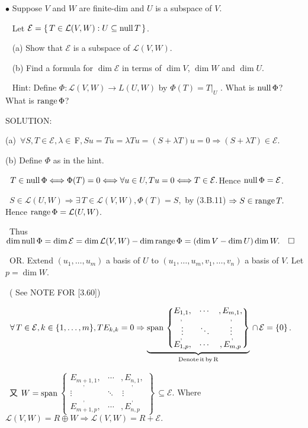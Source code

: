 \documentclass[a4paper, 11pt, UTF8]{article}
\def\range{\textup{range}\,}
\def\null{\textup{null\,}}
\def\Spn{\textup{span}\,}
\def\Lm{\mathcal{L}}
\def\Fbfc{$\,{\timesbf F}$}
\begin{document}
\begin{large}
{\small $\bullet$} {\timessl\Large 
Suppose $V$ and $W$ are finite-dim and $U$ is a subspace of $V$.}\par\,\,\,
{\timessl\Large Let $\mathcal{E} = \{\,T\in\Lm(V, W): U\subseteq\null T\,\}$.}\par\,\,\,
(a) {\timessl\Large Show that $\mathcal{E}$ is a subspace of $\Lm(V, W)$.}\par\,\,\,
(b) {\timessl\Large Find a formula for $\dim \mathcal{E}$ in terms of $\dim V$, $\dim W$ and $\dim U$.}\par\,\,\,
{\timessl\normalsize
Hint: Define $\Phi:\Lm(V, W)\rightarrow L(U, W)$ by $\Phi(T) = T|_U$ . What is $\null\Phi$?
What is $\range\Phi$?
}\par
{\timesbf S\footnotesize{OLUTION:}}\par\quad
(a) \,$\forall S,T\in\mathcal{E},\lambda\in\Fbfc,Su=Tu=\lambda Tu=(S+\lambda T)u=0\Rightarrow(S+\lambda T)\in\mathcal{E}.$\par\quad
(b) Define $\Phi$ as in the hint.\par\qquad\,
$T\in\null\Phi\Longleftrightarrow\Phi(T)=0\Longleftrightarrow\forall u\in U,Tu=0\Longleftrightarrow T\in\mathcal{E}.$\qquad\qquad\qquad Hence $\null\Phi=\mathcal{E}$.\par\qquad\,
$S\in\Lm(U,W)\Rightarrow\exists\,T\in\Lm(V,W),\Phi(T)=S,$ by (3.B.11) $\Rightarrow S\in\range T.\,$\quad Hence $\range\Phi=\Lm(U,W)$.\par\qquad\,
Thus $\dim\null\Phi=\dim\mathcal{E}=\dim\Lm(V,W)-\dim\range\Phi=(\dim V-\dim U)\dim W.\quad\square$%
\par\qquad\,
O{\small R}. Extend $(u_1,\dots,u_m)$ a basis of $U$ to $(u_1,\dots,u_m,v_1,\dots,v_n)$ a basis of $V$. Let $p=\dim W$.\par\qquad\,
( See N{\small OTE} F{\small OR} [3.60])\par\qquad\,
$\forall \,T\in\mathcal{E},k\in\{1,\dots,m\},TE_{k,k}=0\Rightarrow\underbrace{\Spn\begin{Bmatrix} \underset{,}{E_{1,1}}, & \cdots & ,\underset{,}{E_{m,1}},\\ \vdots & \ddots & \,\vdots\\ \overset{,}{E_{1,p}}, & \cdots & ,\overset{,}{E_{m,p}}\end{Bmatrix}}_{\textup{Denote\,it\,by\,R}}\,\cap\,\mathcal{E}=\{0\}$.\par\qquad\,
又 $W=\Spn${\footnotesize$\begin{Bmatrix} \underset{,}{E_{m+1,1}}, & \cdots & ,\underset{,}{E_{n,1}},\\ \vdots & \ddots & \,\vdots\\ \overset{,}{E_{m+1,p}}, & \cdots & ,\overset{,}{E_{n,p}}\end{Bmatrix}$}$\,\subseteq\mathcal{E}$. Where $\Lm(V,W)=R\oplus W\Rightarrow\Lm(V,W)=R+\mathcal{E}.$\par\qquad\,

\end{large}
\end{document}
